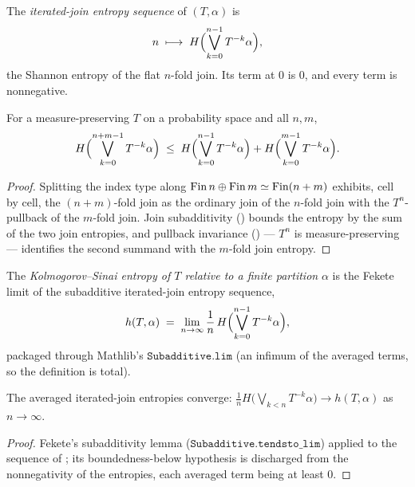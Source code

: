 \begin{definition}\label{ksEntropySeq}
  \leanok
  The \emph{iterated-join entropy sequence} of \((T,\alpha)\) is
  \[
    n \;\longmapsto\; H\Bigl(\bigvee_{k=0}^{n-1}T^{-k}\alpha\Bigr),
  \]
  the Shannon entropy of the flat \(n\)-fold join. Its term at \(0\) is \(0\), and every term is
  nonnegative.
\end{definition}

\begin{theorem}\label{ksEntropySeq_subadditive}
  \leanok
  For a measure-preserving \(T\) on a probability space and all \(n,m\),
  \[
    H\Bigl(\bigvee_{k=0}^{n+m-1}T^{-k}\alpha\Bigr) \;\le\;
      H\Bigl(\bigvee_{k=0}^{n-1}T^{-k}\alpha\Bigr) + H\Bigl(\bigvee_{k=0}^{m-1}T^{-k}\alpha\Bigr).
  \]
\end{theorem}
\begin{proof}\leanok
  Splitting the index type along \(\operatorname{Fin} n\oplus\operatorname{Fin} m\simeq\operatorname{Fin}(n+m)\) exhibits, cell by cell, the
  \((n+m)\)-fold join as the ordinary join of the \(n\)-fold join with the \(T^n\)-pullback of the
  \(m\)-fold join. Join subadditivity () bounds the entropy by the sum of
  the two join entropies, and pullback invariance () --- \(T^n\) is
  measure-preserving --- identifies the second summand with the \(m\)-fold join entropy.
\end{proof}

\begin{definition}\label{ksEntropyPartition}
  \leanok
  The \emph{Kolmogorov--Sinai entropy of \(T\) relative to a finite partition} \(\alpha\) is the
  Fekete limit of the subadditive iterated-join entropy sequence,
  \[
    h(T,\alpha) \;=\; \lim_{n\to\infty}\frac1n\,H\Bigl(\bigvee_{k=0}^{n-1}T^{-k}\alpha\Bigr),
  \]
  packaged through Mathlib's \(\texttt{Subadditive.lim}\) (an infimum of the averaged terms, so
  the definition is total).
\end{definition}

\begin{theorem}\label{tendsto_ksEntropySeq}
  \leanok
  The averaged iterated-join entropies converge:
  \(\frac1n H\bigl(\bigvee_{k<n}T^{-k}\alpha\bigr)\to h(T,\alpha)\) as \(n\to\infty\).
\end{theorem}
\begin{proof}\leanok
  Fekete's subadditivity lemma (\(\texttt{Subadditive.tendsto\_lim}\)) applied to the sequence of
  ; its boundedness-below hypothesis is discharged from the
  nonnegativity of the entropies, each averaged term being at least \(0\).
\end{proof}

